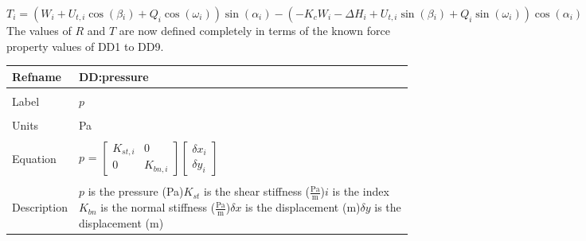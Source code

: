 \documentclass[12pt]{article}
\begin{document}
\begin{equation}
T_{i}=\left(W_{i}+U_{t,i}\cos\left(\beta{}_{i}\right)+Q_{i}\cos\left(\omega{}_{i}\right)\right)\sin\left(\alpha{}_{i}\right)-\left(-K_{c}W_{i}-{\Delta{}H}_{i}+U_{t,i}\sin\left(\beta{}_{i}\right)+Q_{i}\sin\left(\omega{}_{i}\right)\right)\cos\left(\alpha{}_{i}\right)
\end{equation}
The values of $R$ and $T$ are now defined completely in terms of the known force property values of DD1 to DD9.
~\newline
\noindent \begin{minipage}{\textwidth}
\begin{tabular}{p{} p{}}
\toprule \textbf{Refname} & \textbf{DD:pressure}
\label{DD:pressure}
\\ \midrule \\
Label & $p$
\\ \midrule \\
Units & Pa
\\ \midrule \\
Equation & $p$ = $\begin{bmatrix}
K_{st,i} & 0\\
0 & K_{bn,i}
\end{bmatrix}\begin{bmatrix}
{\delta{}x}_{i}\\
{\delta{}y}_{i}
\end{bmatrix}$
\\ \midrule \\
Description & $p$ is the pressure (Pa)\newline$K_{st}$ is the shear stiffness ($\frac{\text{Pa}}{\text{m}}$)\newline$i$ is the index\newline$K_{bn}$ is the normal stiffness ($\frac{\text{Pa}}{\text{m}}$)\newline$\delta{}x$ is the displacement (m)\newline$\delta{}y$ is the displacement (m)
\\ \bottomrule \end{tabular}
\end{minipage}\\
~\newline
\end{document}
